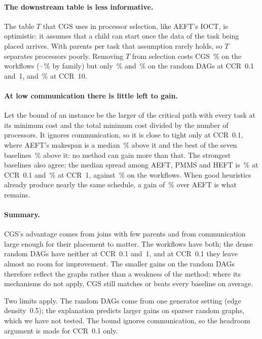 \paragraph{The downstream table is less informative.}
The table $T$ that CGS uses in processor selection, like AEFT's IOCT, is optimistic: it assumes that a child
can start once the data of the task being placed arrives. With \WRRandParents{} parents per task that
assumption rarely holds, so $T$ separates processors poorly. Removing $T$ from selection costs CGS
\WRWfTable\,\% on the workflows (\WRWfMinTable--\WRWfMaxTable\,\% by family) but only \WRRLowTable\,\% and
\WRRMidTable\,\% on the random DAGs at CCR~0.1 and~1, and \WRRHighTable\,\% at CCR~10.

\paragraph{At low communication there is little left to gain.}
Let the bound of an instance be the larger of the critical path with every task at its minimum cost and the
total minimum cost divided by the number of processors. It ignores communication, so it is close to tight
only at CCR~0.1, where AEFT's makespan is a median \WRRLowAeftGap\,\% above it and the best of the seven
baselines \WRRLowBestGap\,\% above it: no method can gain more than that. The strongest baselines also agree:
the median spread among AEFT, PMMS and HEFT is \WRRLowSpread\,\% at CCR~0.1 and \WRRMidSpread\,\% at CCR~1,
against \WRWfSpread\,\% on the workflows. When good heuristics already produce nearly the same schedule, a gain
of \WRRLowVsAeft\,\% over AEFT is what remains.

\paragraph{Summary.}
CGS's advantage comes from joins with few parents and from communication large enough for their placement to
matter. The workflows have both; the dense random DAGs have neither at CCR~0.1 and~1, and at CCR~0.1 they leave
almost no room for improvement. The smaller gains on the random DAGs therefore reflect the graphs rather than a
weakness of the method: where its mechanisms do not apply, CGS still matches or beats every baseline on average.

Two limits apply. The random DAGs come from one generator setting (edge density~0.5); the explanation predicts
larger gains on sparser random graphs, which we have not tested. The bound ignores communication, so the
headroom argument is made for CCR~0.1 only.

